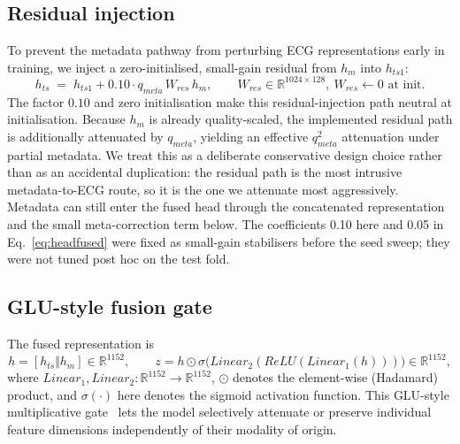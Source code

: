 \documentclass[mathematics,article,submit,pdftex]{Definitions/mdpi}
\def\mathrm#1{#1}%
\def\mathbf#1{#1}%
\begin{document}
\subsection{Residual injection}
To prevent the metadata pathway from perturbing ECG representations early in training, we inject a zero-initialised, small-gain residual from $\mathbf{h}_{\mathrm{m}}$ into $\mathbf{h}_{\mathrm{ts1}}$:
\begin{equation}\label{eq:hts}
\mathbf{h}_{\mathrm{ts}} \;=\; \mathbf{h}_{\mathrm{ts1}} + 0.10\cdot q_{\mathrm{meta}}\,\mathbf{W}_{\mathrm{res}}\,\mathbf{h}_{\mathrm{m}},
\qquad \mathbf{W}_{\mathrm{res}}\in\mathbb{R}^{1024\times 128},\ \mathbf{W}_{\mathrm{res}}\!\leftarrow\!0 \text{ at init.}
\end{equation}
The factor $0.10$ and zero initialisation make this residual-injection path neutral at initialisation. Because $\mathbf{h}_{\mathrm{m}}$ is already quality-scaled, the implemented residual path is additionally attenuated by $q_{\mathrm{meta}}$, yielding an effective $q_{\mathrm{meta}}^{2}$ attenuation under partial metadata. We treat this as a deliberate conservative design choice rather than as an accidental duplication: the residual path is the most intrusive metadata-to-ECG route, so it is the one we attenuate most aggressively. Metadata can still enter the fused head through the concatenated representation and the small meta-correction term below. The coefficients 0.10 here and 0.05 in Eq.~\eqref{eq:headfused} were fixed as small-gain stabilisers before the seed sweep; they were not tuned post hoc on the test fold.

\subsection{GLU-style fusion gate}
The fused representation is
\begin{equation}
\mathbf{h} = [\mathbf{h}_{\mathrm{ts}}\Vert \mathbf{h}_{\mathrm{m}}]\in\mathbb{R}^{1152}, \qquad
\mathbf{z} = \mathbf{h} \odot \sigma\!\bigl(\mathrm{Linear}_2(\mathrm{ReLU}(\mathrm{Linear}_1(\mathbf{h})))\bigr)\in\mathbb{R}^{1152},
\end{equation}
where $\mathrm{Linear}_1,\mathrm{Linear}_2:\mathbb{R}^{1152}\to\mathbb{R}^{1152}$, $\odot$ denotes the element-wise (Hadamard) product, and $\sigma(\cdot)$ here denotes the sigmoid activation function. This GLU-style multiplicative gate~\cite{Dauphin2017} lets the model selectively attenuate or preserve individual feature dimensions independently of their modality of origin.
\end{document}
